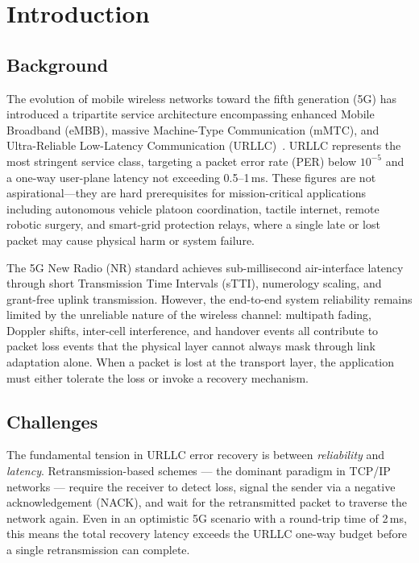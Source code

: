 \documentclass[conference]{IEEEtran}
\begin{document}
\section{Introduction}

\subsection{Background}

The evolution of mobile wireless networks toward the fifth generation
(5G) has introduced a tripartite service architecture encompassing
enhanced Mobile Broadband (eMBB), massive Machine-Type Communication
(mMTC), and Ultra-Reliable Low-Latency Communication
(URLLC)~\cite{3gpp_5g}. URLLC represents the most stringent service
class, targeting a packet error rate (PER) below $10^{-5}$ and a
one-way user-plane latency not exceeding 0.5--1\,ms. These figures are
not aspirational---they are hard prerequisites for mission-critical
applications including autonomous vehicle platoon coordination, tactile
internet, remote robotic surgery, and smart-grid protection relays, where
a single late or lost packet may cause physical harm or system failure.

The 5G New Radio (NR) standard achieves sub-millisecond air-interface
latency through short Transmission Time Intervals (sTTI), numerology
scaling, and grant-free uplink transmission. However, the end-to-end
system reliability remains limited by the unreliable nature of the
wireless channel: multipath fading, Doppler shifts, inter-cell
interference, and handover events all contribute to packet loss events
that the physical layer cannot always mask through link adaptation alone.
When a packet is lost at the transport layer, the application must either
tolerate the loss or invoke a recovery mechanism.

\subsection{Challenges}

The fundamental tension in URLLC error recovery is between
\emph{reliability} and \emph{latency}. Retransmission-based schemes ---
the dominant paradigm in TCP/IP networks --- require the receiver to
detect loss, signal the sender via a negative acknowledgement (NACK),
and wait for the retransmitted packet to traverse the network again.
Even in an optimistic 5G scenario with a round-trip time of 2\,ms, this
means the total recovery latency exceeds the URLLC one-way budget
before a single retransmission can complete.
\end{document}
